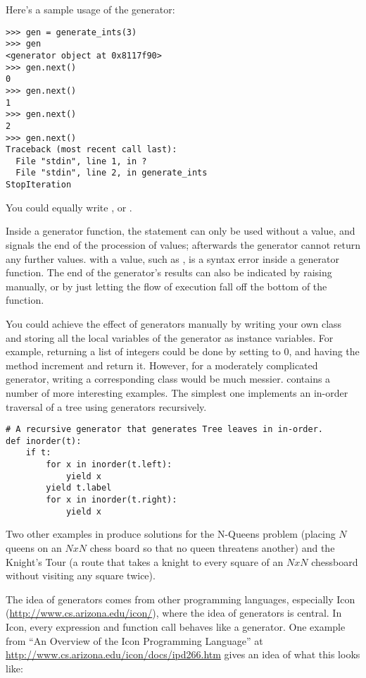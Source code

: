 \documentclass{howto}
\begin{document}
Here's a sample usage of the  generator:

\begin{verbatim}
>>> gen = generate_ints(3)
>>> gen
<generator object at 0x8117f90>
>>> gen.next()
0
>>> gen.next()
1
>>> gen.next()
2
>>> gen.next()
Traceback (most recent call last):
  File "stdin", line 1, in ?
  File "stdin", line 2, in generate_ints
StopIteration
\end{verbatim}

You could equally write , or
.

Inside a generator function, the  statement can only
be used without a value, and signals the end of the procession of
values; afterwards the generator cannot return any further values.
 with a value, such as , is a syntax
error inside a generator function.  The end of the generator's results
can also be indicated by raising  manually,
or by just letting the flow of execution fall off the bottom of the
function.

You could achieve the effect of generators manually by writing your
own class and storing all the local variables of the generator as
instance variables.  For example, returning a list of integers could
be done by setting  to 0, and having the
 method increment  and return it.
However, for a moderately complicated generator, writing a
corresponding class would be much messier.
 contains a number of more
interesting examples.  The simplest one implements an in-order
traversal of a tree using generators recursively.

\begin{verbatim}
# A recursive generator that generates Tree leaves in in-order.
def inorder(t):
    if t:
        for x in inorder(t.left):
            yield x
        yield t.label
        for x in inorder(t.right):
            yield x
\end{verbatim}

Two other examples in  produce
solutions for the N-Queens problem (placing $N$ queens on an $NxN$
chess board so that no queen threatens another) and the Knight's Tour
(a route that takes a knight to every square of an $NxN$ chessboard
without visiting any square twice).

The idea of generators comes from other programming languages,
especially Icon (\url{http://www.cs.arizona.edu/icon/}), where the
idea of generators is central.  In Icon, every
expression and function call behaves like a generator.  One example
from ``An Overview of the Icon Programming Language'' at
\url{http://www.cs.arizona.edu/icon/docs/ipd266.htm} gives an idea of
what this looks like:
\end{document}
